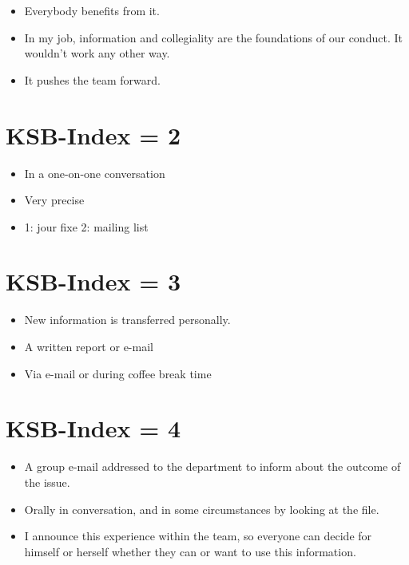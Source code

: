 \documentclass[twocolumn, serif, empirical, authordate]{jote-article}
\begin{document}
\begin{itemize} \item Everybody benefits from it.
\item In my job, information and collegiality are the foundations of our conduct. It wouldn't work any other way.
\item It pushes the team forward.
\end{itemize} 

\section*{KSB-Index = 2}
\label{sec:KSB-Index = 2}

\begin{itemize} \item In a one-on-one conversation \item Very precise \item 1: jour fixe 2: mailing list \end{itemize} 

\section*{KSB-Index = 3}
\label{sec:KSB-Index = 3}

\begin{itemize} \item New information is transferred personally.
\item A written report or e-mail \item Via e-mail or during coffee break time \end{itemize} 

\section*{KSB-Index = 4}
\label{sec:KSB-Index = 4}

\begin{itemize} \item A group e-mail addressed to the department to inform about the outcome of the issue.
\item Orally in conversation, and in some circumstances by looking at the file.
\item I announce this experience within the team, so everyone can decide for himself or herself whether they can or want to use this information.
\end{itemize} 
\end{document}
